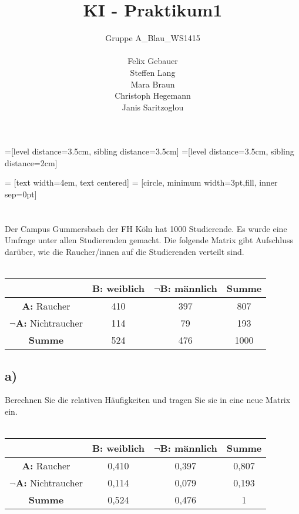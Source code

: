 \documentclass[12pt, a4paper]{article}
\title{KI - Praktikum1}
\author{Gruppe A\_Blau\_WS1415\\\\
    Felix Gebauer\\
    Steffen Lang\\
    Mara Braun\\
    Christoph Hegemann\\
    Janis Saritzoglou}
\newcommand{\changefont}[3]{
\fontfamily{#1} \fontseries{#2} \fontshape{#3} \selectfont}
\begin{document}

=[level distance=3.5cm, sibling distance=3.5cm]
=[level distance=3.5cm, sibling distance=2cm]

 = [text width=4em, text centered]
 = [circle, minimum width=3pt,fill, inner sep=0pt]

\maketitle
\newpage
\section{}
Der Campus Gummersbach der FH Köln hat 1000 Studierende. Es wurde eine Umfrage unter
allen Studierenden gemacht. Die folgende Matrix gibt Aufschluss darüber, wie die
Raucher/innen auf die Studierenden verteilt sind.\\\\

\begin{tabular}[bct]{|c|c|c|c|}
\hline \bigstrut
& \textbf{B:} weiblich & \textbf{$\neg$B:} männlich &\textbf{Summe}\\
\hline \bigstrut
\textbf{A:} Raucher & 410 & 397 & 807 \\
\hline \bigstrut
\textbf{$\neg$A:} Nichtraucher & 114 & 79 & 193 \\
\hline \bigstrut
\textbf{Summe} & 524 & 476 & 1000\\ \hline
\end{tabular}
\subsection*{a)}
Berechnen Sie die relativen Häufigkeiten und tragen Sie sie in eine
neue Matrix ein.\\\\

\begin{tabular}[bct]{|c|c|c|c|}
\hline \bigstrut
& \textbf{B:} weiblich & \textbf{$\neg$B:} männlich &\textbf{Summe}\\
\hline \bigstrut
\textbf{A:} Raucher & 0,410 & 0,397 & 0,807 \\
\hline \bigstrut
\textbf{$\neg$A:} Nichtraucher & 0,114 & 0,079 & 0,193 \\
\hline \bigstrut
\textbf{Summe} & 0,524 & 0,476 & 1\\ \hline
\end{tabular}
\end{document}
